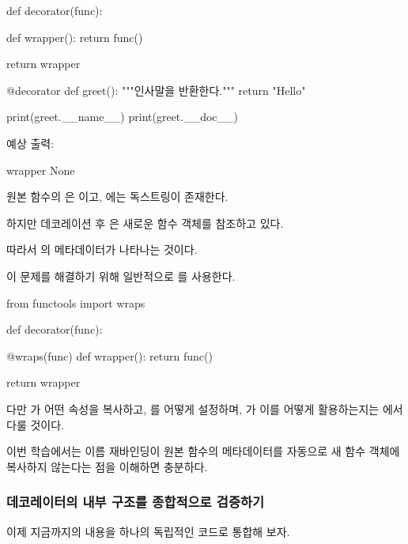 \begin{dhkcode}
def decorator(func):

    def wrapper():
        return func()

    return wrapper


@decorator
def greet():
    """인사말을 반환한다."""
    return "Hello"


print(greet.__name__)
print(greet.__doc__)
\end{dhkcode}

예상 출력:

\begin{dhkzsh}
wrapper
None
\end{dhkzsh}

원본 함수의 은 이고, 에는 독스트링이 존재한다.

하지만 데코레이션 후 은 새로운  함수 객체를 참조하고 있다.

따라서 의 메타데이터가 나타나는 것이다.

이 문제를 해결하기 위해 일반적으로 를 사용한다.

\begin{dhkcode}
from functools import wraps


def decorator(func):

    @wraps(func)
    def wrapper():
        return func()

    return wrapper
\end{dhkcode}

다만 가 어떤 속성을 복사하고, 를 어떻게 설정하며, 가 이를 어떻게 활용하는지는 에서 다룰 것이다.

이번 학습에서는 이름 재바인딩이 원본 함수의 메타데이터를 자동으로 새 함수 객체에 복사하지 않는다는 점을 이해하면 충분하다.

\subsubsection{데코레이터의 내부 구조를 종합적으로 검증하기}

이제 지금까지의 내용을 하나의 독립적인 코드로 통합해 보자.

